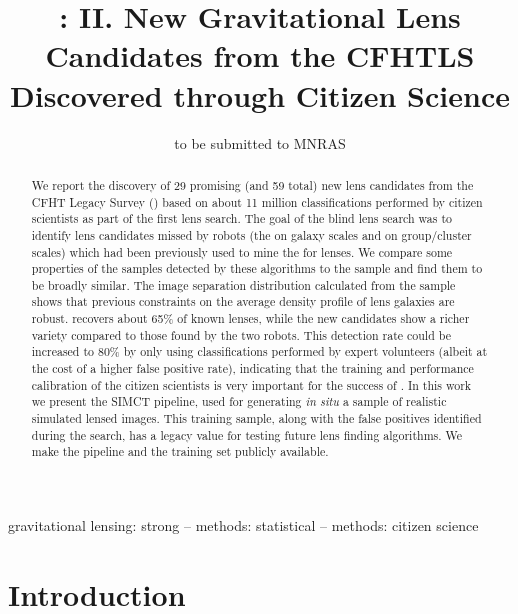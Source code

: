 \documentclass[useAMS,usenatbib,a4paper]{mn2e}
\title[New Gravitational Lens Candidates from CFHTLS]
{\SW: II. New Gravitational Lens Candidates from the CFHTLS Discovered
through Citizen Science}
\author[More et al.]{%
 
}
\begin{document}
\date{to be submitted to MNRAS}
\pagerange{\pageref{firstpage}--\pageref{lastpage}}

\maketitle

\label{firstpage}


\begin{abstract}
We report the discovery of 29 promising (and 59 total) new lens
candidates from the CFHT Legacy Survey (\cfhtls) based on about 11
million classifications performed by citizen scientists as part of the
first \sw lens search.  The goal of the blind lens search was to
identify lens candidates missed by robots (the \rf on galaxy scales and
\af on group/cluster scales) which had been previously used to mine the
\cfhtls for lenses.  We compare some properties of the samples detected
by these algorithms to the \sw sample and find them to be broadly
similar.  The image separation distribution calculated from the \sw
sample shows that previous constraints on the average density profile of
lens galaxies are robust. \sw recovers about 65\% of known lenses, while
the new candidates show a richer variety compared to those found by the
two robots. This detection rate could be increased to 80\% by only using
classifications performed by expert volunteers (albeit at the cost of a
higher false positive rate), indicating that the training and
performance calibration of the citizen scientists is very important for
the success of \sw. In this work we present the SIMCT pipeline, used for
generating {\it in situ} a sample of realistic  simulated lensed images.
This training sample, along with the false positives identified during
the search, has a legacy value for testing future lens finding
algorithms. We make the pipeline and the training set publicly
available.
\end{abstract}

\begin{keywords}
  gravitational lensing: strong   --
  methods: statistical            --
  methods: citizen science
\end{keywords}

\setcounter{footnote}{1}


\section{Introduction}
\label{sec:intro}
\end{document}
